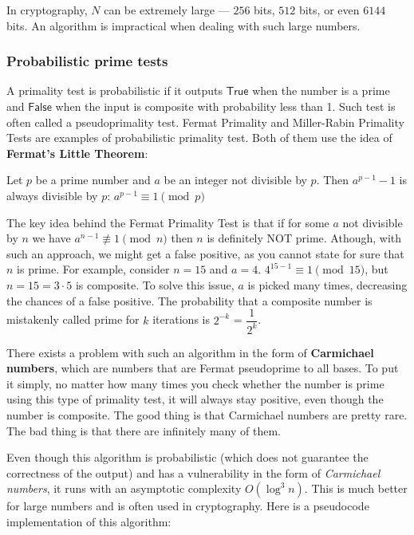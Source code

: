\documentclass[../lecture-notes.tex]{subfiles}
\begin{document}
In cryptography, $N$ can be extremely large — $256$ bits, $512$ bits, or even $6144$ bits. 
An algorithm is impractical when dealing with such large numbers.

\subsubsection{Probabilistic prime tests}

A primality test is probabilistic if it outputs $\mathsf{True}$ when the number is a prime and $\mathsf{False}$ when the input is composite with probability less than 1. Such test is often called a pseudoprimality test.
Fermat Primality and Miller-Rabin Primality Tests are examples of probabilistic primality test. Both of them use the idea of \textbf{Fermat's Little Theorem}:

\begin{theorem}
    Let $p$ be a prime number and $a$ be an integer not divisible by $p$. Then $a ^ {p-1} - 1$ is always divisible by $p$:  $a^{p-1} \equiv 1 \pmod{p}$
\end{theorem}

The key idea behind the Fermat Primality Test is that if for some $a$ not divisible by $n$ we have $a^{n-1} \not\equiv 1 \pmod{n}$ then $n$ is definitely NOT prime.
Athough, with such an approach, we might get a false positive, as you cannot state for sure that $n$ is prime. For example, consider $n = 15$ and $a = 4$.
$4^{15-1} \equiv 1 \pmod{15}$, but $n = 15 = 3 \cdot 5$ is composite. To solve this issue, $a$ is picked many times, decreasing the chances of a false positive.
The probability that a composite number is mistakenly called prime for $k$ iterations is $2^{-k}$ = $\dfrac{1}{2^k}$.

There exists a problem with such an algorithm in the form of \textbf{Carmichael numbers}, which are numbers that are Fermat pseudoprime to all bases. To put it simply,
no matter how many times you check whether the number is prime using this type of primality test, it will always stay positive, even though the number is
composite. The good thing is that Carmichael numbers are pretty rare. The bad thing is that there are infinitely many of them. 

Even though this algorithm is probabilistic (which does not guarantee the correctness of the output) and has a vulnerability in the form of \textit{Carmichael numbers},
it runs with an asymptotic complexity $O(\log^3{n})$. This is much better for large numbers and is often used in cryptography. Here is a pseudocode implementation of this algorithm:
\end{document}
